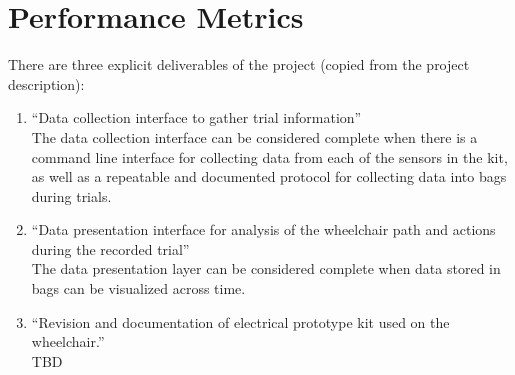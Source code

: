 \documentclass[onecolumn, draftclsnofoot,10pt, compsoc]{IEEEtran}
\begin{document}
\section{Performance Metrics}
	There are three explicit deliverables of the project (copied from the project description): 
\begin{enumerate}
	\item \large{“Data collection interface to gather trial information”}
	\\
	\normalsize The data collection interface can be considered complete when there is a command line interface for collecting data from each of the sensors in the kit, as well as a repeatable and documented protocol for collecting data into bags during trials. 
	\\
	\item \large {“Data presentation interface for analysis of the wheelchair path and actions during the recorded trial”}
	\\
	\normalsize The data presentation layer can be considered complete when data stored in bags can be visualized across time.\\
	\item \large{“Revision and documentation of electrical prototype kit used on the wheelchair.”}
	\\
	\normalsize TBD
\end{enumerate}
\end{document}
